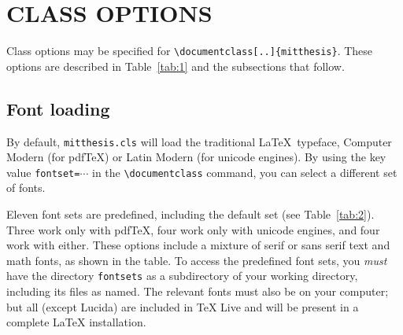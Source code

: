 \documentclass[11pt]{article}
\newcommand*\pdfTeX{pdf\TeX}
\begin{document}
\section{CLASS OPTIONS}
Class options may be specified for \verb|\documentclass[..]{mitthesis}|. These options are described in Table~\ref{tab:1} and the subsections that follow.

\begin{table}[b]
\caption{Options to the document class\label{tab:1}}
\smallskip\setlength\extrarowheight{3pt}%
%
\end{table}

\subsection{Font loading}
By default, \texttt{mitthesis.cls} will load the traditional \LaTeX\ typeface, Computer Modern (for \pdfTeX) or Latin Modern (for unicode engines).  By using the key value \texttt{fontset=$\cdots$} in the \verb|\documentclass| command, you can select a different set of fonts.  

Eleven font sets are predefined, including the default set (see Table~\ref{tab:2}).  Three work only with \pdfTeX, four work only with unicode engines, and four work with either.  These options include a mixture of serif or sans serif text and math fonts, as shown in the table. To access the predefined font sets, you \textit{must} have the directory \texttt{fontsets} as a subdirectory of your working directory, including its files as named. The relevant fonts must also be on your computer; but all (except Lucida) are included in TeX Live and will be present in a complete \LaTeX{} installation.
\end{document}
